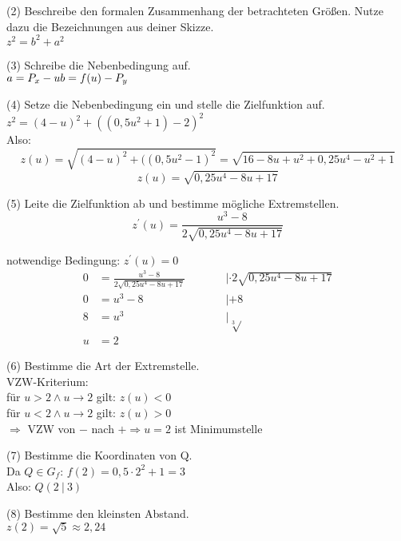 (2) Beschreibe den formalen Zusammenhang der betrachteten Größen. Nutze dazu die Bezeichnungen aus deiner Skizze.\\
$z^2 = b^2 + a^2$ \newline

(3) Schreibe die Nebenbedingung auf. \\
$a = P_x -u \\ b = f(u) - P_y$ \newline

(4) Setze die Nebenbedingung ein und stelle die Zielfunktion auf. \\
$z^2 = (4-u)^2 + ((0,5u^2+1)-2)^2$ \\
Also: $$z(u) = \sqrt{(4-u)^2 + ((0,5u^2-1)^2} = \sqrt{16-8u+u^2+0,25u^4-u^2+1} $$
$$z(u) = \sqrt{0,25u^4 -8u +17}$$

(5) Leite die Zielfunktion ab und bestimme mögliche Extremstellen. \\
$$z^\prime(u) = \frac{u^3 -8}{2\sqrt{0,25u^4 -8u +17}}$$

notwendige Bedingung: $z^\prime(u) = 0$
\begin{equation*}
    \begin{aligned}
        0 & = \frac{u^3 -8}{2\sqrt{0,25u^4 -8u +17}} & \qquad & |\cdot 2\sqrt{0,25u^4 -8u +17} \\
        0 & = u^3 - 8 & \qquad & | +8 \\
        8 & = u^3 & & | \sqrt[3]{} \\
        u & = 2
    \end{aligned}
\end{equation*}

(6) Bestimme die Art der Extremstelle. \\

VZW-Kriterium: \\
für $u>2 \land u \to 2$ gilt: $z(u) < 0$ \\
für $u<2 \land u \to 2$ gilt: $z(u) > 0$ \\
$\Rightarrow$ VZW von $-$ nach $+ \Rightarrow u = 2$ ist Minimumstelle

(7) Bestimme die Koordinaten von Q.\\

Da $Q \in G_f$: $f(2) = 0,5\cdot2^2 +1 = 3$\\
Also: $Q(2 \ | \ 3)$

(8) Bestimme den kleinsten Abstand.\\

$z(2) = \sqrt{5} \approx 2,24$